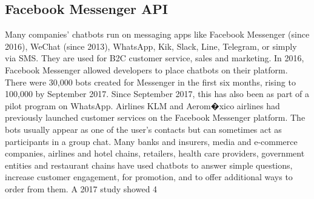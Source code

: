   \subsection{Facebook Messenger API}
Many companies' chatbots run on messaging apps like Facebook Messenger (since 2016), WeChat (since 2013), WhatsApp, Kik, Slack, Line, Telegram, or simply via SMS. They are used for B2C customer service, sales and marketing. 
In 2016, Facebook Messenger allowed developers to place chatbots on their platform. There were 30,000 bots created for Messenger in the first six months, rising to 100,000 by September 2017.
Since September 2017, this has also been as part of a pilot program on WhatsApp. Airlines KLM and Aerom�xico  airlines had previously launched customer services on the Facebook Messenger platform.
The bots usually appear as one of the user's contacts but can sometimes act as participants in a group chat.
Many banks and insurers, media and e-commerce companies, airlines and hotel chains, retailers, health care providers, government entities and restaurant chains have used chatbots to answer simple questions, increase customer engagement, for promotion, and to offer additional ways to order from them. 
A 2017 study showed 4%

